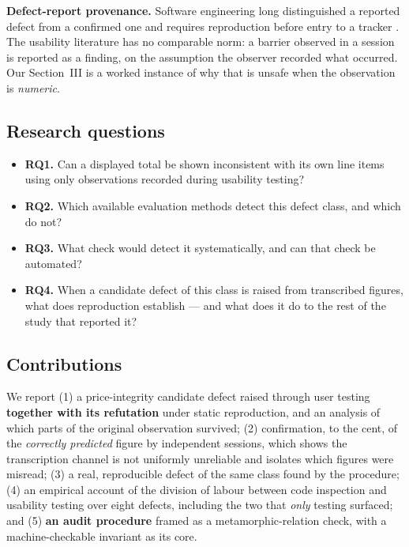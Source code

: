 \documentclass[conference]{IEEEtran}
\begin{document}
\textbf{Defect-report provenance.} Software engineering long distinguished a reported defect from a
confirmed one and requires reproduction before entry to a tracker \cite{sei2002}. The usability
literature has no comparable norm: a barrier observed in a session is reported as a finding, on the
assumption the observer recorded what occurred. Our Section~III is a worked instance of why that is
unsafe when the observation is \emph{numeric}.

\subsection{Research questions}

\begin{itemize}
\item \textbf{RQ1.} Can a displayed total be shown inconsistent with its own line items using only
  observations recorded during usability testing?
\item \textbf{RQ2.} Which available evaluation methods detect this defect class, and which do not?
\item \textbf{RQ3.} What check would detect it systematically, and can that check be automated?
\item \textbf{RQ4.} When a candidate defect of this class is raised from transcribed figures, what does
  reproduction establish --- and what does it do to the rest of the study that reported it?
\end{itemize}

\subsection{Contributions}

We report (1) a price-integrity candidate defect raised through user testing \textbf{together with its
refutation} under static reproduction, and an analysis of which parts of the original observation
survived; (2) confirmation, to the cent, of the \emph{correctly predicted} figure by independent
sessions, which shows the transcription channel is not uniformly unreliable and isolates which figures
were misread; (3) a real, reproducible defect of the same class found by the procedure; (4) an
empirical account of the division of labour between code inspection and usability testing over eight
defects, including the two that \emph{only} testing surfaced; and (5) \textbf{an audit procedure} framed
as a metamorphic-relation check, with a machine-checkable invariant as its core.
\end{document}
